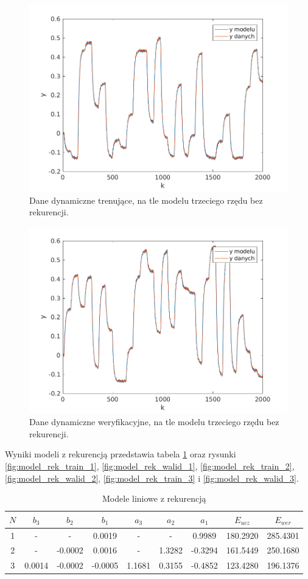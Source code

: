 \documentclass{article}
\begin{document}
\begin{figure}
	\centering
	\includegraphics[width=0.7\linewidth]{../dane_dynamiczne/model_bez_rek_train_3}
	\caption{Dane dynamiczne trenujące, na tle modelu trzeciego rzędu bez rekurencji.}
	\label{fig:model_bez_rek_train_3}
\end{figure}

\begin{figure}
	\centering
	\includegraphics[width=0.7\linewidth]{../dane_dynamiczne/model_bez_rek_walid_3}
	\caption{Dane dynamiczne weryfikacyjne, na tle modelu trzeciego rzędu bez rekurencji.}
	\label{fig:model_bez_rek_walid_3}
\end{figure}

Wyniki modeli z rekurencją przedstawia tabela \ref{tab:rek} oraz rysunki \ref{fig:model_rek_train_1}, \ref{fig:model_rek_walid_1}, \ref{fig:model_rek_train_2}, \ref{fig:model_rek_walid_2}, \ref{fig:model_rek_train_3} i \ref{fig:model_rek_walid_3}.
\begin{table}
	\begin{tabular}{|c|c|c|c|c|c|c|c|c|}
		\hline 
		$N$ & $b_3$ & $b_2$ & $b_1$ & $a_3$ & $a_2$ & $a_1$ & $E_{ucz}$ & $E_{wer}$ \\ 
		\hline 
		1 & - & - & 0.0019 & - & - & 0.9989 & 180.2920 & 285.4301 \\ 
		\hline 
		2 & - & -0.0002 & 0.0016 & - & 1.3282 & -0.3294 & 161.5449 & 250.1680 \\ 
		\hline 
		3 & 0.0014 & -0.0002 & -0.0005  & 1.1681  & 0.3155 & -0.4852 & 123.4280
		 & 196.1376 \\ 
		\hline 
	\end{tabular}
	\label{tab:rek}
	\caption{Modele liniowe z rekurencją}
\end{table}
\end{document}
